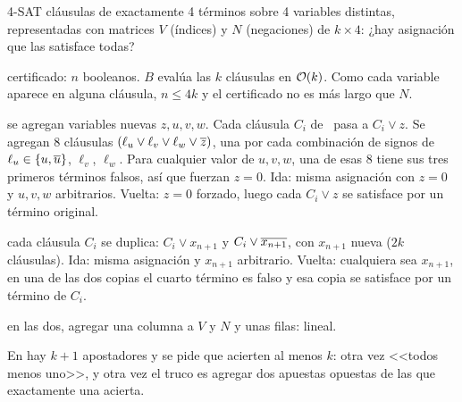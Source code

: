 \begin{problema}{4-SAT}
 cláusulas de exactamente 4 términos sobre 4 variables distintas, representadas con matrices $V$ (índices) y $N$ (negaciones) de $k\times4$: ¿hay asignación que las satisface todas?

 certificado: $n$ booleanos. $B$ evalúa las $k$ cláusulas en $\mathcal{O}(k)$. Como cada variable aparece en alguna cláusula, $n\le 4k$ y el certificado no es más largo que $N$.

 se agregan variables nuevas $z,u,v,w$. Cada cláusula $C_i$ de \npTSAT\ pasa a $C_i\vee z$. Se agregan 8 cláusulas $(\ell_u\vee\ell_v\vee\ell_w\vee\overline{z})$, una por cada combinación de signos de $\ell_u\in\{u,\overline{u}\}$, $\ell_v$, $\ell_w$. Para cualquier valor de $u,v,w$, una de esas 8 tiene sus tres primeros términos falsos, así que fuerzan $z=0$. Ida: misma asignación con $z=0$ y $u,v,w$ arbitrarios. Vuelta: $z=0$ forzado, luego cada $C_i\vee z$ se satisface por un término original.

 cada cláusula $C_i$ se duplica: $C_i\vee x_{n+1}$ y $C_i\vee\overline{x_{n+1}}$, con $x_{n+1}$ nueva ($2k$ cláusulas). Ida: misma asignación y $x_{n+1}$ arbitrario. Vuelta: cualquiera sea $x_{n+1}$, en una de las dos copias el cuarto término es falso y esa copia se satisface por un término de $C_i$.

 en las dos, agregar una columna a $V$ y $N$ y unas filas: lineal.
\end{problema}

En  hay $k+1$ apostadores y se pide que acierten al menos $k$: otra vez <<todos menos uno>>, y otra vez el truco es agregar dos apuestas opuestas de las que exactamente una acierta.

